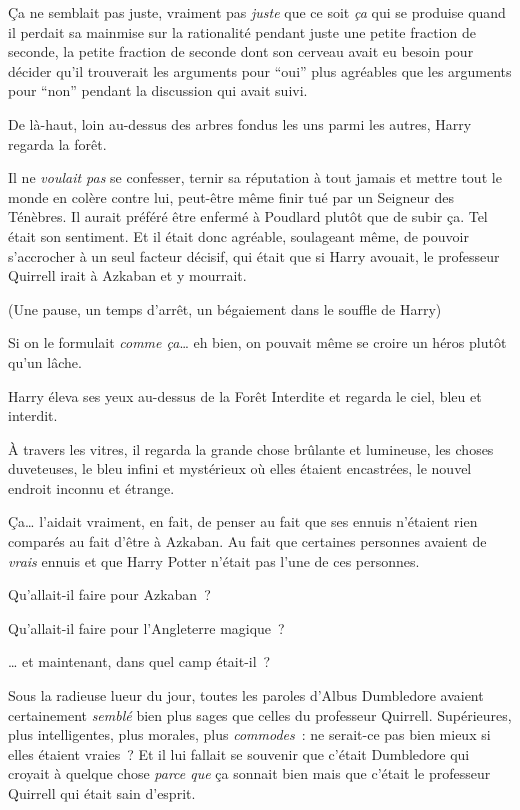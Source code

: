 Ça ne semblait pas juste, vraiment pas \emph{juste} que ce soit \emph{ça} qui se produise quand il perdait sa mainmise sur la rationalité pendant juste une petite fraction de seconde, la petite fraction de seconde dont son cerveau avait eu besoin pour décider qu'il trouverait les arguments pour “oui” plus agréables que les arguments pour “non” pendant la discussion qui avait suivi.

De là-haut, loin au-dessus des arbres fondus les uns parmi les autres, Harry regarda la forêt.

Il ne \emph{voulait pas} se confesser, ternir sa réputation à tout jamais et mettre tout le monde en colère contre lui, peut-être même finir tué par un Seigneur des Ténèbres. Il aurait préféré être enfermé à Poudlard plutôt que de subir ça. Tel était son sentiment. Et il était donc agréable, soulageant même, de pouvoir s'accrocher à un seul facteur décisif, qui était que si Harry avouait, le professeur Quirrell irait à Azkaban et y mourrait.

(Une pause, un temps d'arrêt, un bégaiement dans le souffle de Harry)

Si on le formulait \emph{comme ça}… eh bien, on pouvait même se croire un héros plutôt qu'un lâche.

Harry éleva ses yeux au-dessus de la Forêt Interdite et regarda le ciel, bleu et interdit.

À travers les vitres, il regarda la grande chose brûlante et lumineuse, les choses duveteuses, le bleu infini et mystérieux où elles étaient encastrées, le nouvel endroit inconnu et étrange.

Ça… l'aidait vraiment, en fait, de penser au fait que ses ennuis n'étaient rien comparés au fait d'être à Azkaban. Au fait que certaines personnes avaient de \emph{vrais} ennuis et que Harry Potter n'était pas l'une de ces personnes.

Qu'allait-il faire pour Azkaban~?

Qu'allait-il faire pour l'Angleterre magique~?

… et maintenant, dans quel camp était-il~?

Sous la radieuse lueur du jour, toutes les paroles d'Albus Dumbledore avaient certainement \emph{semblé} bien plus sages que celles du professeur Quirrell. Supérieures, plus intelligentes, plus morales, plus \emph{commodes}~: ne serait-ce pas bien mieux si elles étaient vraies~? Et il lui fallait se souvenir que c'était Dumbledore qui croyait à quelque chose \emph{parce que} ça sonnait bien mais que c'était le professeur Quirrell qui était sain d'esprit.

